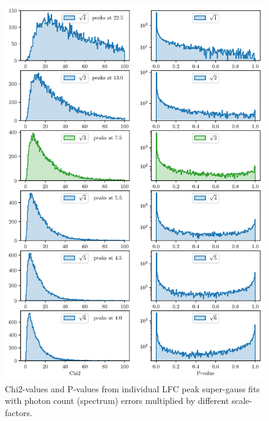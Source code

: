 \begin{figure}[ht]
    \centering
    \includegraphics[scale=0.80]{figures/calib_errors_extensive.pdf}
    \caption{Chi2-values and P-values from individual LFC peak super-gauss fits with photon count (spectrum) errors multiplied by different scale-factors.}
    \label{fig:calib_errors_extensive}
\end{figure}


